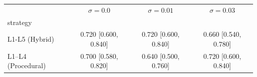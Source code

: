 \begin{tabular}{lccc}
\toprule
 & $\sigma=0.0$ & $\sigma=0.01$ & $\sigma=0.03$ \\
strategy &  &  &  \\
\midrule
L1-L5 (Hybrid) & 0.720 [0.600, 0.840] & 0.720 [0.600, 0.840] & 0.660 [0.540, 0.780] \\
L1–L4 (Procedural) & 0.700 [0.580, 0.820] & 0.640 [0.500, 0.760] & 0.720 [0.600, 0.840] \\
\bottomrule
\end{tabular}
